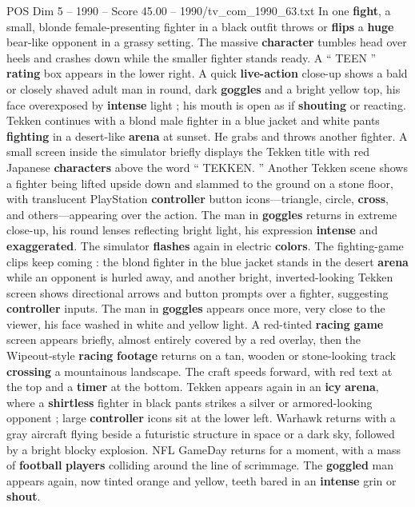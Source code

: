 \begin{textsample}{POS Dim 5 – 1990 – Score 45.00 – 1990/tv\_com\_1990\_63.txt}
In one \textbf{fight}, a small, blonde female-presenting fighter in a black outfit throws or \textbf{flips} a \textbf{huge} bear-like opponent in a grassy setting.
The massive \textbf{character} tumbles head over heels and crashes down while the smaller fighter stands ready.
A “ TEEN ” \textbf{rating} box appears in the lower right.
A quick \textbf{live-action} close-up shows a bald or closely shaved adult man in round, dark \textbf{goggles} and a bright yellow top, his face overexposed by \textbf{intense} light ; his mouth is open as if \textbf{shouting} or reacting.
Tekken continues with a blond male fighter in a blue jacket and white pants \textbf{fighting} in a desert-like \textbf{arena} at sunset.
He grabs and throws another fighter.
A small screen inside the simulator briefly displays the Tekken title with red Japanese \textbf{characters} above the word “ TEKKEN. ” Another Tekken scene shows a fighter being lifted upside down and slammed to the ground on a stone floor, with translucent PlayStation \textbf{controller} button icons—triangle, circle, \textbf{cross}, and others—appearing over the action.
The man in \textbf{goggles} returns in extreme close-up, his round lenses reflecting bright light, his expression \textbf{intense} and \textbf{exaggerated}.
The simulator \textbf{flashes} again in electric \textbf{colors}.
The fighting-game clips keep coming : the blond fighter in the blue jacket stands in the desert \textbf{arena} while an opponent is hurled away, and another bright, inverted-looking Tekken screen shows directional arrows and button prompts over a fighter, suggesting \textbf{controller} inputs.
The man in \textbf{goggles} appears once more, very close to the viewer, his face washed in white and yellow light.
A red-tinted \textbf{racing} \textbf{game} screen appears briefly, almost entirely covered by a red overlay, then the Wipeout-style \textbf{racing} \textbf{footage} returns on a tan, wooden or stone-looking track \textbf{crossing} a mountainous landscape.
The craft speeds forward, with red text at the top and a \textbf{timer} at the bottom.
Tekken appears again in an \textbf{icy} \textbf{arena}, where a \textbf{shirtless} fighter in black pants strikes a silver or armored-looking opponent ; large \textbf{controller} icons sit at the lower left.
Warhawk returns with a gray aircraft flying beside a futuristic structure in space or a dark sky, followed by a bright blocky explosion.
NFL GameDay returns for a moment, with a mass of \textbf{football} \textbf{players} colliding around the line of scrimmage.
The \textbf{goggled} man appears again, now tinted orange and yellow, teeth bared in an \textbf{intense} grin or \textbf{shout}.

\end{textsample}
